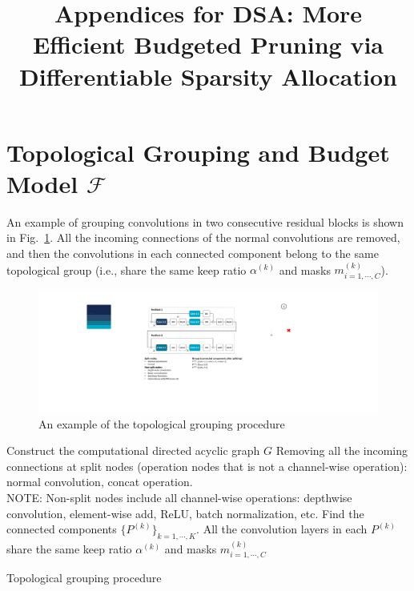 \documentclass[runningheads]{llncs}
\newcommand{\flops}{\mathcal{F}}
\begin{document}
  
  
  {}
  
  
  \pagestyle{headings}
  \title{Appendices for DSA: More Efficient Budgeted Pruning via Differentiable Sparsity Allocation}
  \author{}
  \institute{}
  
  \maketitle
  
  \section{Topological Grouping and Budget Model $\flops$}
  
  An example of grouping convolutions in two consecutive residual blocks is shown in Fig.~\ref{fig:grouping}. All the incoming connections of the normal convolutions are removed, and then the convolutions in each connected component belong to the same topological group (i.e., share the same keep ratio $\alpha^{(k)}$ and masks ${m^{(k)}_{i=1,\cdots,C}}$).
  
  \begin{figure}[h]
  \begin{center}
  \includegraphics[width=0.85\linewidth]{figs/grouping.pdf}
  \caption{An example of the topological grouping procedure}
  \label{fig:grouping}
  \end{center}
  \end{figure}

  \begin{algorithm}[h]
  \begin{algorithmic}[1]
  \STATE Construct the computational directed acyclic graph $G$
  \STATE Removing all the incoming connections at split nodes (operation nodes that is not a channel-wise operation): normal convolution, concat operation. \\NOTE: Non-split nodes include all channel-wise operations: depthwise convolution, element-wise add, ReLU, batch normalization, etc.
  \STATE Find the connected components $\{P^{(k)}\}_{k=1,\cdots,K}$. All the convolution layers in each $P^{(k)}$ share the same keep ratio $\alpha^{(k)}$ and masks ${m^{(k)}_{i=1,\cdots,C}}$
  \end{algorithmic}
  \caption{Topological grouping procedure}
  \label{alg:grouping}
  \end{algorithm}
  
\end{document}
